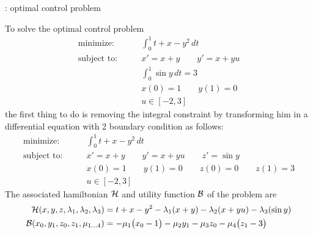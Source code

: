 \begin{example}{: optimal control problem}
	
	To solve the optimal control problem
	\begin{align*}
		\textrm{minimize:} \qquad & \int_0^1 t + x - y^2 \, dt   \\
		\textrm{subject to:} \qquad & x' = x+y \qquad y' = x + yu \\
		& \int_0^1\sin y\, dt = 3\\
		& x(0) = 1 \qquad  y(1) = 0 \\
		& u \in [-2,3]
	\end{align*}
	the first thing to do is removing the integral constraint by transforming him in a differential equation with 2 boundary condition as follows:
	\begin{align*}
		\textrm{minimize:} \qquad & \int_0^1 t + x - y^2 \, dt   \\
		\textrm{subject to:} \qquad & x' = x+y \qquad y' = x + yu \qquad z' = \sin y \\
		& x(0) = 1 \qquad  y(1) = 0 \qquad z(0) = 0 \qquad z(1) = 3 \\
		& u \in [-2,3]
	\end{align*}
	The associated hamiltonian $\mathcal{H}$ and utility function $\mathcal{B}$ of the problem are
	\begin{align*}
		\mathcal{H}(x,y,z,\lambda_1, \lambda_2, \lambda_3) & = t + x - y^2 - \lambda_1 (x+y) - \lambda_2 (x+yu) - \lambda_3 (\sin y) \\
		\mathcal{B}(x_0, y_1, z_0, z_1, \mu_{1\dots 4}) & = -\mu_1 \big(x_0 - 1\big) - \mu_2 y_1 - \mu_3 z_0 - \mu_4 \big(z_1 -3\big) 
	\end{align*}
	

\end{example}
